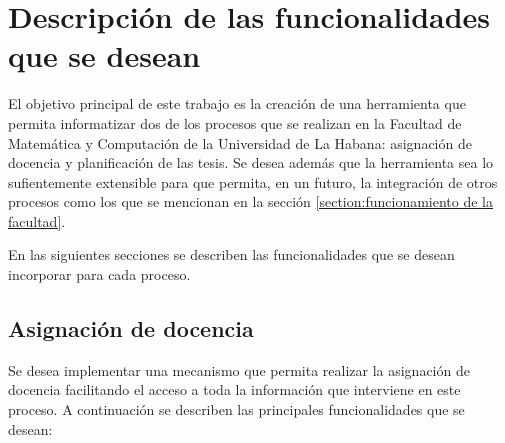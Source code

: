 \chapter{Descripción de las funcionalidades que se desean}\label{chapter:features}
El objetivo principal de este trabajo es la creación de una herramienta
que permita informatizar dos de los procesos que se realizan en la Facultad de Matemática y
Computación de la Universidad de La Habana: asignación de docencia y planificación de las tesis. 
Se desea además que la herramienta sea lo sufientemente 
extensible para que permita, en un futuro, la integración de otros procesos como los que se mencionan en la 
sección \ref{section:funcionamiento de la facultad}.



En las siguientes secciones se describen las funcionalidades
que se desean incorporar para cada proceso.















\section{Asignación de docencia}\label{docencia:cap2}
Se desea implementar una mecanismo que permita realizar la asignación de docencia 
facilitando el acceso a toda la información que interviene en este proceso. A continuación 
se describen las principales funcionalidades que se desean:


